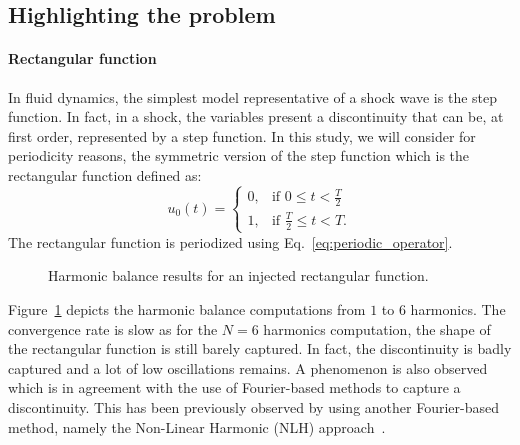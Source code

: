 

\subsection{Highlighting the problem}

\paragraph{Rectangular function}

In fluid dynamics, the simplest model 
representative of a shock wave
is the step function.
In fact, in a
shock, the variables present a discontinuity
that can be, at first order, represented by a 
step function. In this study, we will consider for periodicity reasons,
the symmetric version of the step function which is the
rectangular function defined as:
\begin{equation}
    u_0(t) = 
    \begin{cases}
        0, & \text{if } 0 \leq t < \frac{T}{2} \\
        1, & \text{if } \frac{T}{2} \leq t < T.
    \end{cases}
    \label{eq:inject_step}
\end{equation}
The rectangular function is periodized using Eq.~\eqref{eq:periodic_operator}.

\begin{figure}[htbp]
  \centering
  \caption{Harmonic balance results for 
  an injected rectangular function.}
  \label{fig:inj_step_results}
\end{figure}

Figure~\ref{fig:inj_step_results} depicts the harmonic balance
computations from $1$ to $6$ harmonics. The convergence rate 
is slow as for the $N=6$ harmonics computation, the
shape of the rectangular function is still barely captured. 
In fact, the discontinuity is badly captured and a lot of low
oscillations remains. A
\citet{Gibbs1899} phenomenon is also observed which is in agreement with 
the use of Fourier-based methods to capture a discontinuity. This has been
previously observed by \citet{Hembera2009} using
another Fourier-based method, namely the Non-Linear 
Harmonic (NLH) approach~\cite{He1998}.

